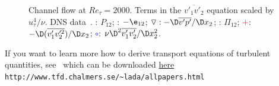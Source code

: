 \begin{figure}[h!]
\centering
\begin{minipage}[b]{0.5\textwidth}
\end{minipage}%
\begin{minipage}[b]{0.5\textwidth}
\end{minipage}
\caption{Channel flow at $Re_\tau=2000$. Terms in the $\overline{v'_1v'_2}$ equation scaled by $u_\tau^4/\nu$.
DNS data~\cite{hoyas:jimenez:06,hoyas:jimenez:web:data}.
\solidline: $P_{12}$;
\dashedline: $-\e_{12}$;
$\triangledown: -\D\overline{v'p'}/\D x_2$;
\dashdottedline: $\Pi_{12}$;
\textcolor{red}{$+$}: $-\D(\overline{v'_1v^{\prime 2}_2})/\D x_2$;
\textcolor{blue}{$\circ$}: $\nu \D^2\overline{v'_1v'_2}/\D x_2^2$.}
\label{uv_balance}
\end{figure}

If you want to learn more how to derive transport equations of turbulent quantities,
see~\cite{davidson:transport:06} which can be downloaded
\href{http://www.tfd.chalmers.se/~lada/allpapers.html}{here}\\
{\tt http://www.tfd.chalmers.se/\textasciitilde lada/allpapers.html}


